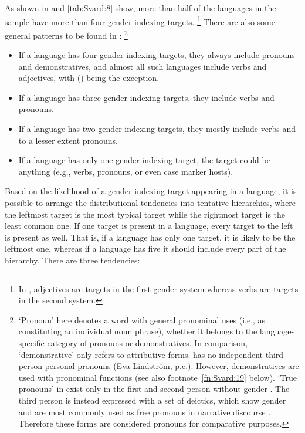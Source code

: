 \documentclass[output=collectionpaper]{langsci/langscibook}
\begin{document}
As shown in  and \ref{tab:Svard:8} show, more than half of the languages in the sample have more than four gender-indexing targets.%
\footnote{%
In , adjectives are targets in the first gender system whereas verbs are targets in the second system.
} %
There are also some general patterns to be found in :%
\footnote{%
`Pronoun' here denotes a word with general pronominal uses (i.e., as constituting an individual noun phrase), whether it belongs to the language-specific category of pronouns or demonstratives. In comparison, `demonstrative' only refers to attributive forms.  has no independent third person personal pronouns (Eva Lindström, p.c.). However, demonstratives are used with pronominal functions (see also footnote~\ref{fn:Svard:19} below). `True pronouns' in  exist only in the first and second person without gender \citep[111]{Foley1991}. The third person is instead expressed with a set of deictics, which show gender and are most commonly used as free pronouns in narrative discourse \citep[113]{Foley1991}. Therefore these forms are considered pronouns for comparative purposes.
}%

\begin{itemize}
\item If a language has four gender-indexing targets, they always include pronouns and demonstratives, and almost all such languages include verbs and adjectives, with  () being the exception.
\item If a language has three gender-indexing targets, they include verbs and pronouns.
\item If a language has two gender-indexing targets, they mostly include verbs and to a lesser extent pronouns.
\item If a language has only one gender-indexing target, the target could be anything (e.g., verbs, pronouns, or even case marker hosts).
\end{itemize}

Based on the likelihood of a gender-indexing target appearing in a language, it is possible to arrange the distributional tendencies into tentative hierarchies, where the leftmost target is the most typical target while the rightmost target is the least common one. If one target is present in a language, every target to the left is present as well. That is, if a language has only one target, it is likely to be the leftmost one, whereas if a language has five it should include every part of the hierarchy. There are three tendencies:
\end{document}
